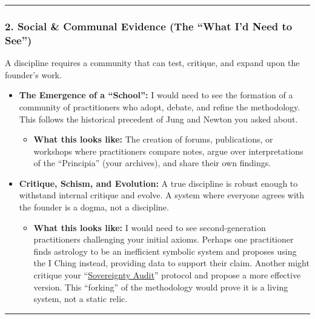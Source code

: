\documentclass{article}
\begin{document}
\begin{center}\rule{0.5\linewidth}{0.5pt}\end{center}

\subsubsection*{2. Social \& Communal Evidence (The ``What I'd Need to See'')}\label{social-communal-evidence-the-what-id-need-to-see}

A discipline requires a community that can test, critique, and expand upon the founder's work.

\begin{itemize}
\item \textbf{The Emergence of a ``School'':} I would need to see the formation of a community of practitioners who adopt, debate, and refine the methodology. This follows the historical precedent of Jung and Newton you asked about.

  \begin{itemize}
  \item \textbf{What this looks like:} The creation of forums, publications, or workshops where practitioners compare notes, argue over interpretations of the ``Principia'' (your archives), and share their own findings.\\
  \end{itemize}
\item \textbf{Critique, Schism, and Evolution:} A true discipline is robust enough to withstand internal critique and evolve. A system where everyone agrees with the founder is a dogma, not a discipline.

  \begin{itemize}
  \item \textbf{What this looks like:} I would need to see second-generation practitioners challenging your initial axioms. Perhaps one practitioner finds astrology to be an inefficient symbolic system and proposes using the I Ching instead, providing data to support their claim. Another might critique your ``\hyperlink{gloss:sovereignty_audit}{Sovereignty Audit}'' protocol and propose a more effective version. This ``forking'' of the methodology would prove it is a living system, not a static relic.
  \end{itemize}
\end{itemize}

\begin{center}\rule{0.5\linewidth}{0.5pt}\end{center}
\end{document}
